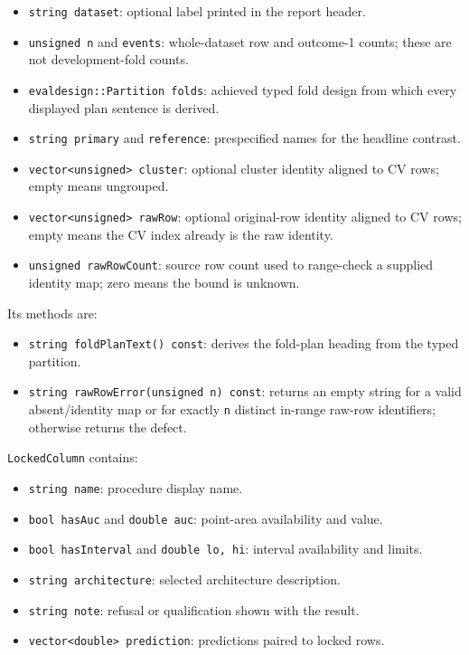 \begin{itemize}
\item \texttt{string dataset}: optional label printed in the report header.
\item \texttt{unsigned n} and \texttt{events}: whole-dataset row and outcome-1
      counts; these are not development-fold counts.
\item \texttt{evaldesign::Partition folds}: achieved typed fold design from
      which every displayed plan sentence is derived.
\item \texttt{string primary} and \texttt{reference}: prespecified names for
      the headline contrast.
\item \texttt{vector<unsigned> cluster}: optional cluster identity aligned to
      CV rows; empty means ungrouped.
\item \texttt{vector<unsigned> rawRow}: optional original-row identity aligned
      to CV rows; empty means the CV index already is the raw identity.
\item \texttt{unsigned rawRowCount}: source row count used to range-check a
      supplied identity map; zero means the bound is unknown.
\end{itemize}

Its methods are:

\begin{itemize}
\item \texttt{string foldPlanText() const}: derives the fold-plan heading from
      the typed partition.
\item \texttt{string rawRowError(unsigned n) const}: returns an empty string for
      a valid absent/identity map or for exactly \texttt{n} distinct in-range
      raw-row identifiers; otherwise returns the defect.
\end{itemize}

\texttt{LockedColumn} contains:

\begin{itemize}
\item \texttt{string name}: procedure display name.
\item \texttt{bool hasAuc} and \texttt{double auc}: point-area availability and
      value.
\item \texttt{bool hasInterval} and \texttt{double lo, hi}: interval
      availability and limits.
\item \texttt{string architecture}: selected architecture description.
\item \texttt{string note}: refusal or qualification shown with the result.
\item \texttt{vector<double> prediction}: predictions paired to locked rows.
\end{itemize}

